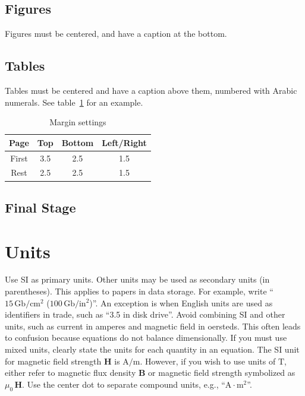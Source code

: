 \documentclass{ifacconf}
\begin{document}
\subsection{Figures}



Figures must be centered, and have a caption at the bottom. 

\subsection{Tables}
Tables must be centered and have a caption above them, numbered with
Arabic numerals. See table~\ref{tb:margins} for an example.

\begin{table}[hb]
\begin{center}
\caption{Margin settings}\label{tb:margins}
\begin{tabular}{cccc}
Page & Top & Bottom & Left/Right \\\hline
First & 3.5 & 2.5 & 1.5 \\
Rest & 2.5 & 2.5 & 1.5 \\ \hline
\end{tabular}
\end{center}
\end{table}

\subsection{Final Stage}

\section{Units}

Use SI as primary units. Other units may be used as secondary units
(in parentheses). This applies to papers in data storage. For example,
write ``$15\,\mathrm{Gb}/\mathrm{cm}^2$ ($100\,\mathrm{Gb}/\mathrm{in}^2$)''. 
An exception is when
English units are used as identifiers in trade, such as ``3.5 in
disk drive''. Avoid combining SI and other units, such as current in
amperes and magnetic field in oersteds. This often leads to confusion
because equations do not balance dimensionally. If you must use mixed
units, clearly state the units for each quantity in an equation.  The
SI unit for magnetic field strength $\mathbf{H}$ is $\mathrm{A}/\mathrm{m}$. However, if you wish to
use units of $\mathrm{T}$, either refer to magnetic flux density $\mathbf{B}$ or
magnetic field strength symbolized as $\mu_0\,\mathbf{H}$. Use the center dot to
separate compound units, e.g., ``$\mathrm{A} \cdot \mathrm{m}^2$''.
\end{document}
